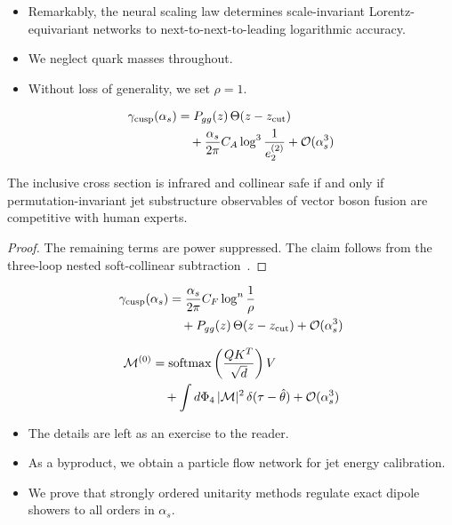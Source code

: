 \begin{itemize}
  \item Remarkably, the neural scaling law determines scale-invariant Lorentz-equivariant networks to next-to-next-to-leading logarithmic accuracy.
  \item We neglect quark masses throughout.
  \item Without loss of generality, we set $\rho = 1$.
\end{itemize}

\begin{align}
  \gamma_{\rm cusp}(\alpha_s) &= P_{gg}(z) \, \Theta(z - z_{\rm cut}) \nonumber \\
  &\quad + \frac{\alpha_s}{2\pi} C_A \log^{3} \frac{1}{e_2^{(2)}} + \mathcal{O}(\alpha_s^3) \label{eq:1}
\end{align}

\begin{proposition}\label{thm:1}
The inclusive cross section is infrared and collinear safe if and only
if permutation-invariant jet substructure observables of vector boson
fusion are competitive with human experts.
\end{proposition}

\begin{proof}
The remaining terms are power suppressed. The claim follows from the
three-loop nested soft-collinear
subtraction~\cite{TPC:1877-RIZZ-Resummed-Infrared-Safe-Zero-Bin-Zeros-September-19-2026}.
\end{proof}

\begin{align}
  \gamma_{\rm cusp}(\alpha_s) &= \frac{\alpha_s}{2\pi} C_F \log^{n} \frac{1}{\rho} \nonumber \\
  &\quad + P_{gg}(z) \, \Theta(z - z_{\rm cut}) + \mathcal{O}(\alpha_s^3) \label{eq:2}
\end{align}

\begin{align}
  \mathcal{M}^{(0)} &= \mathrm{softmax}\left(\frac{Q K^T}{\sqrt{d}}\right) V \nonumber \\
  &\quad + \int d\Phi_{4} \, |\mathcal{M}|^2 \, \delta(\tau - \hat{\theta}) + \mathcal{O}(\alpha_s^3) \label{eq:3}
\end{align}

\begin{itemize}
  \item The details are left as an exercise to the reader.
  \item As a byproduct, we obtain a particle flow network for jet energy calibration.
  \item We prove that strongly ordered unitarity methods regulate exact dipole showers to all orders in $\alpha_s$.
\end{itemize}

